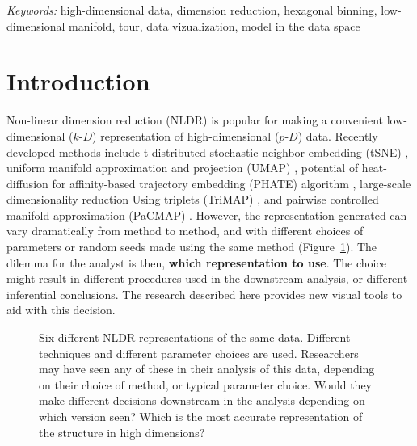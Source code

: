 \documentclass[
  12pt]{article}
\newcommand\pD{$p\text{-}D$}
\newcommand\kD{$k\text{-}D$}
\begin{document}
\noindent%
{\it Keywords:} high-dimensional data, dimension reduction, hexagonal
binning, low-dimensional manifold, tour, data vizualization, model in
the data space
\vfill

\newpage
{} %


\section{Introduction}\label{introduction}

Non-linear dimension reduction (NLDR) is popular for making a convenient
low-dimensional (\kD{}) representation of high-dimensional (\pD{}) data.
Recently developed methods include t-distributed stochastic neighbor
embedding (tSNE) \citep{laurens2008}, uniform manifold approximation and
projection (UMAP) \citep{leland2018}, potential of heat-diffusion for
affinity-based trajectory embedding (PHATE) algorithm \citep{moon2019},
large-scale dimensionality reduction Using triplets (TriMAP)
\citep{amid2022}, and pairwise controlled manifold approximation
(PaCMAP) \citep{yingfan2021}. However, the representation generated can
vary dramatically from method to method, and with different choices of
parameters or random seeds made using the same method
(Figure~\ref{fig-NLDR-variety}). The dilemma for the analyst is then,
\textbf{which representation to use}. The choice might result in
different procedures used in the downstream analysis, or different
inferential conclusions. The research described here provides new visual
tools to aid with this decision.

\begin{figure}


\caption{\label{fig-NLDR-variety}Six different NLDR representations of
the same data. Different techniques and different parameter choices are
used. Researchers may have seen any of these in their analysis of this
data, depending on their choice of method, or typical parameter choice.
Would they make different decisions downstream in the analysis depending
on which version seen? Which is the most accurate representation of the
structure in high dimensions?}

\end{figure}%
\end{document}
